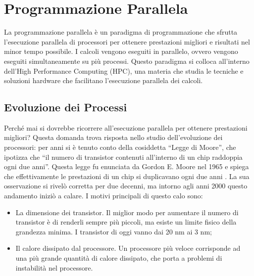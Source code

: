 \documentclass[12pt,a4paper,openright,twoside]{report}
\begin{document}
\rhead[\fancyplain{}{\bfseries\leftmark}]{\fancyplain{}{\bfseries\thepage}}
\clearpage{\pagestyle{empty}\cleardoublepage}
\clearpage{\pagestyle{empty}\cleardoublepage}
\chapter{Programmazione Parallela}

\lhead[\fancyplain{}{\bfseries\thepage}]{\fancyplain{}{\bfseries\rightmark}}

La programmazione parallela è un paradigma di programmazione che sfrutta l'esecuzione parallela di processori per ottenere prestazioni migliori e risultati nel minor tempo possibile. I calcoli vengono eseguiti in parallelo, ovvero vengono eseguiti simultaneamente su più processi. Questo paradigma si colloca all'interno dell'High Performance Computing (HPC), una materia che studia le tecniche e soluzioni hardware che facilitano l'esecuzione parallela dei calcoli.



\section{Evoluzione dei Processi}

Perché mai si dovrebbe ricorrere all'esecuzione parallela per ottenere prestazioni migliori? Questa domanda trova risposta nello studio dell'evoluzione dei processori: per anni si è tenuto conto della cosiddetta ``Legge di Moore'', che ipotizza che ``il numero di transistor contenuti all'interno di un chip raddoppia ogni due anni''. Questa legge fu enunciata da Gordon E. Moore nel 1965 e spiega che effettivamente le prestazioni di un chip si duplicavano ogni due anni \cite{moorelaw}. La sua osservazione si rivelò corretta per due decenni, ma intorno agli anni 2000 questo andamento iniziò a calare. I motivi principali di questo calo sono:

\begin{itemize}
    \item La dimensione dei transistor. Il miglior modo per aumentare il numero di transistor è di renderli sempre più piccoli, ma esiste un limite fisico della grandezza minima. I transistor di oggi vanno dai 20 nm ai 3 nm;
    \item Il calore dissipato dal processore. Un processore più veloce corrisponde ad una più grande quantità di calore dissipato, che porta a problemi di instabilità nel processore.
\end{itemize}
\end{document}
